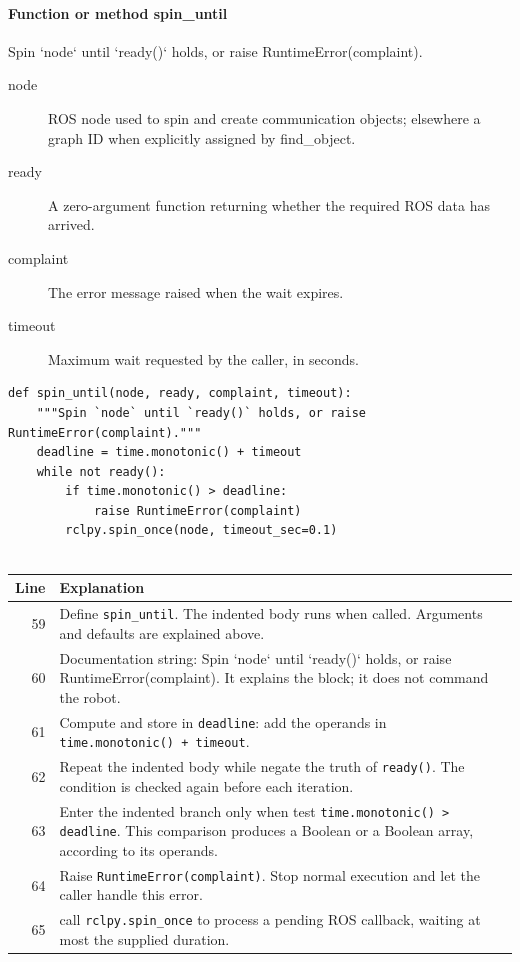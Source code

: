 \documentclass[11pt,a4paper]{book}
\begin{document}
\paragraph{Function or method spin\_until}
Spin `node` until `ready()` holds, or raise RuntimeError(complaint).

\begin{description}
\item[node] ROS node used to spin and create communication objects; elsewhere a graph ID when explicitly assigned by find\_object.
\item[ready] A zero-argument function returning whether the required ROS data has arrived.
\item[complaint] The error message raised when the wait expires.
\item[timeout] Maximum wait requested by the caller, in seconds.
\end{description}

\begin{lstlisting}[firstnumber=59]
def spin_until(node, ready, complaint, timeout):
    """Spin `node` until `ready()` holds, or raise RuntimeError(complaint)."""
    deadline = time.monotonic() + timeout
    while not ready():
        if time.monotonic() > deadline:
            raise RuntimeError(complaint)
        rclpy.spin_once(node, timeout_sec=0.1)


\end{lstlisting}

\begin{longtable}{r p{}}

\textbf{Line} & \textbf{Explanation} \\ \hline \endhead

59 & Define \texttt{spin\_until}. The indented body runs when called. Arguments and defaults are explained above. \\

60 & Documentation string: Spin `node` until `ready()` holds, or raise RuntimeError(complaint). It explains the block; it does not command the robot. \\

61 & Compute and store in \texttt{deadline}: add the operands in \texttt{time.monotonic() + timeout}.  \\

62 & Repeat the indented body while negate the truth of \texttt{ready()}. The condition is checked again before each iteration. \\

63 & Enter the indented branch only when test \texttt{time.monotonic() > deadline}. This comparison produces a Boolean or a Boolean array, according to its operands. \\

64 & Raise \texttt{RuntimeError(complaint)}. Stop normal execution and let the caller handle this error. \\

65 & call \texttt{rclpy.spin\_once} to process a pending ROS callback, waiting at most the supplied duration. \\

\end{longtable}
\end{document}
